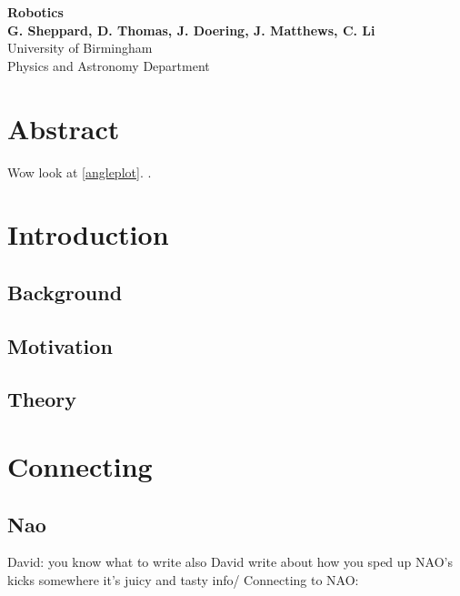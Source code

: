 \documentclass[11pt]{article}
\begin{document}
\begin{titlepage}

    \begin{center}
        \vspace*{1cm}
        \Huge
        \textbf{Robotics} \\
        \vspace{0.5cm}
        \LARGE
        \vspace{1.5cm}
        \textbf{G. Sheppard, D. Thomas, J. Doering, J. Matthews, C. Li} \\
        \vfill
        \vspace{0.8cm}
        \Large
        University of Birmingham\\
        Physics and Astronomy Department\\
    \end{center}
\end{titlepage}

\tableofcontents

\section{Abstract}
Wow look at \ref{angleplot}. \cite{Bae2006}.

\section{Introduction}
\subsection{Background}
\subsection{Motivation}
\subsection{Theory}

\section{Connecting}
\subsection{Nao}


David: you know what to write
also David write about how you sped up NAO's kicks somewhere it's juicy and tasty info/
Connecting to NAO: 
\end{document}
